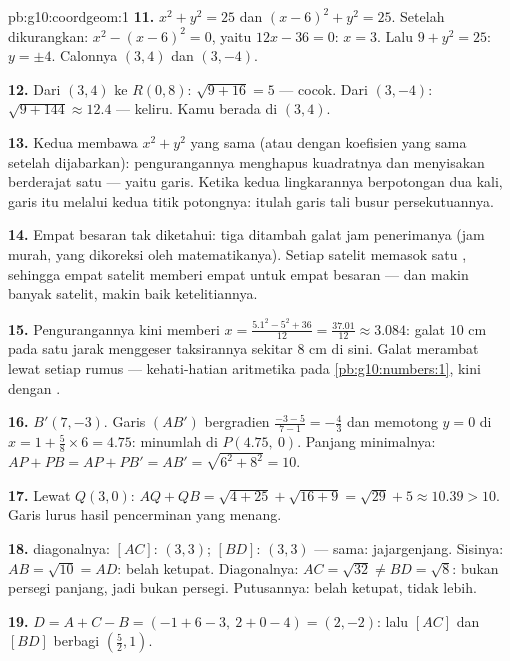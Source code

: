 \begin{solution}{pb:g10:coordgeom:1}
\textbf{11.} $x^2 + y^2 = 25$ dan $(x - 6)^2 + y^2 = 25$.
Setelah dikurangkan: $x^2 - (x - 6)^2 = 0$, yaitu $12x - 36 = 0$:
$x = 3$. Lalu $9 + y^2 = 25$: $y = \pm 4$. Calonnya
$(3, 4)$ dan $(3, -4)$.

\textbf{12.} Dari $(3, 4)$ ke $R(0, 8)$:
$\sqrt{9 + 16} = 5$ --- cocok. Dari $(3, -4)$:
$\sqrt{9 + 144} \approx 12.4$ --- keliru. Kamu berada di $(3, 4)$.

\textbf{13.} Kedua  membawa $x^2 + y^2$ yang sama (atau
dengan koefisien yang sama setelah dijabarkan): pengurangannya menghapus
kuadratnya dan menyisakan  berderajat satu --- yaitu garis.
Ketika kedua lingkarannya berpotongan dua kali, garis itu melalui kedua
titik potongnya: itulah garis tali busur persekutuannya.

\textbf{14.} Empat besaran tak diketahui: tiga  ditambah
galat jam penerimanya (jam murah, yang dikoreksi oleh
matematikanya). Setiap satelit memasok satu , sehingga empat
satelit memberi empat  untuk empat besaran --- dan makin banyak
satelit, makin baik ketelitiannya.

\textbf{15.} Pengurangannya kini memberi
$x = \frac{5.1^2 - 5^2 + 36}{12} = \frac{37.01}{12} \approx
3.084$: galat $10$ cm pada satu jarak menggeser taksirannya
sekitar $8$ cm di sini. Galat merambat lewat setiap rumus ---
kehati-hatian aritmetika  pada \cref{pb:g10:numbers:1},
kini dengan .

\textbf{16.} $B' (7, -3)$. Garis $(AB')$ bergradien
$\frac{-3 - 5}{7 - 1} = -\frac43$ dan memotong $y = 0$ di
$x = 1 + \frac{5}{8} \times 6 = 4.75$: minumlah di
$P(4.75,\ 0)$. Panjang minimalnya: $AP + PB = AP + PB' = AB' =
\sqrt{6^2 + 8^2} = 10$.

\textbf{17.} Lewat $Q(3, 0)$:
$AQ + QB = \sqrt{4 + 25} + \sqrt{16 + 9} = \sqrt{29} + 5
\approx 10.39 > 10$. Garis lurus hasil pencerminan yang menang.

\textbf{18.}  diagonalnya: $[AC]$: $(3, 3)$; $[BD]$:
$(3, 3)$ --- sama: jajargenjang. Sisinya:
$AB = \sqrt{10} = AD$: belah ketupat. Diagonalnya:
$AC = \sqrt{32} \neq BD = \sqrt{8}$: bukan persegi panjang, jadi
bukan persegi. Putusannya: belah ketupat, tidak lebih.

\textbf{19.} $D = A + C - B = (-1 + 6 - 3,\ 2 + 0 - 4) =
(2, -2)$: lalu $[AC]$ dan $[BD]$ berbagi 
$\left(\frac52, 1\right)$.


\end{solution}
